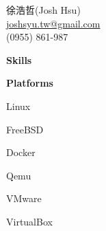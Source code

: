 \documentclass[a4paper,12pt,final]{memoir}
\newcommand{\SmallSep}{\vspace{0.5em}}
\newcommand{\CVSection}[1]
	{\Large\textbf{#1}\par
	\SmallSep\normalsize\normalfont}
\newcommand{\CVItem}[1]
	{\textbf{\color{RoyalBlue} #1}}
\begin{document}
\begin{flushright}\small
	徐浩哲(Josh Hsu) \\
	\footnotesize{\url{joshsyu.tw@gmail.com}}  \\
	(0955) 861-987
\end{flushright}\normalsize
\framebreak
\CVSection{Skills}
\CVItem{Platforms}
\begin{multicols}{3}
\begin{compactitem}[\color{RoyalBlue}$\circ$]
	\item Linux
	\item FreeBSD 
	\item Docker
	\item Qemu
	\item VMware
	\item VirtualBox
\end{compactitem}
\end{multicols}
\SmallSep
\end{document}
